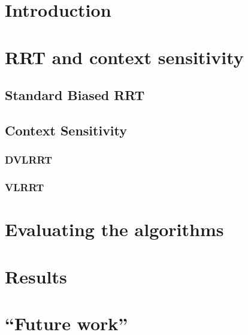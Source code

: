 \documentclass[11pt,twoside,twocolumn]{article}
\begin{document}
\maketitle

\begin{abstract}
 \dots
\end{abstract}

\section{Introduction}

\section{RRT and context sensitivity}

\subsection{Standard Biased RRT}

\subsection{Context Sensitivity}

\subsubsection{DVLRRT}

\subsubsection{VLRRT}

\section{Evaluating the algorithms}

\section{Results}

\section{``Future work''}
\end{document}
